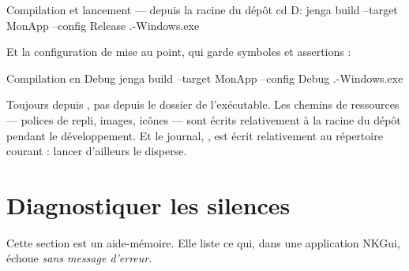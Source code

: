 \begin{nkcode}{Compilation et lancement — depuis la racine du dépôt}
cd D:\Projets{}\Nkentseu\Nkentseu
jenga build --target MonApp --config Release
.\Build\Bin\Release-Windows\MonApp\MonApp.exe
\end{nkcode}

Et la configuration de mise au point, qui garde symboles et assertions :

\begin{nkcode}{Compilation en Debug}
jenga build --target MonApp --config Debug
.\Build\Bin\Debug-Windows\MonApp\MonApp.exe
\end{nkcode}

\begin{nkretenir}
Toujours depuis , pas depuis le dossier
de l'exécutable. Les chemins de ressources — polices de repli, images, icônes —
sont écrits relativement à la racine du dépôt pendant le développement. Et le
journal, , est écrit relativement au répertoire courant :
lancer d'ailleurs le disperse.
\end{nkretenir}

\section{Diagnostiquer les silences}

Cette section est un aide-mémoire. Elle liste ce qui, dans une application
NKGui, échoue \emph{sans message d'erreur}.

